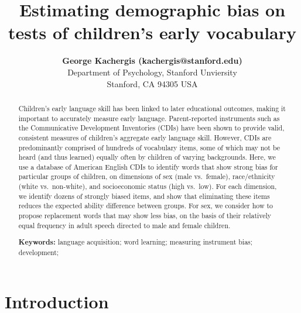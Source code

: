 \documentclass[10pt, letterpaper]{article}
\title{Estimating demographic bias on tests of children's early vocabulary}
\author{{\large \bf George Kachergis (kachergis@stanford.edu)} \AND {\large \bf Nathan Francis (nathan99@stanford.edu)} \AND {\large \bf Michael C. Frank (mcfrank@stanford.edu)} \\ Department of Psychology, Stanford Unviersity \\ Stanford, CA 94305 USA }
\begin{document}
\maketitle

\begin{abstract}
Children's early language skill has been linked to later educational
outcomes, making it important to accurately measure early language.
Parent-reported instruments such as the Communicative Development
Inventories (CDIs) have been shown to provide valid, consistent measures
of children's aggregate early language skill. However, CDIs are
predominantly comprised of hundreds of vocabulary items, some of which
may not be heard (and thus learned) equally often by children of varying
backgrounds. Here, we use a database of American English CDIs to
identify words that show strong bias for particular groups of children,
on dimensions of sex (male vs.~female), race/ethnicity (white
vs.~non-white), and socioeconomic status (high vs.~low). For each
dimension, we identify dozens of strongly biased items, and show that
eliminating these items reduces the expected ability difference between
groups. For sex, we consider how to propose replacement words that may
show less bias, on the basis of their relatively equal frequency in
adult speech directed to male and female children.

\textbf{Keywords:}
language acquisition; word learning; measuring instrument bias;
development;
\end{abstract}

\hypertarget{introduction}{%
\section{Introduction}\label{introduction}}
\end{document}
